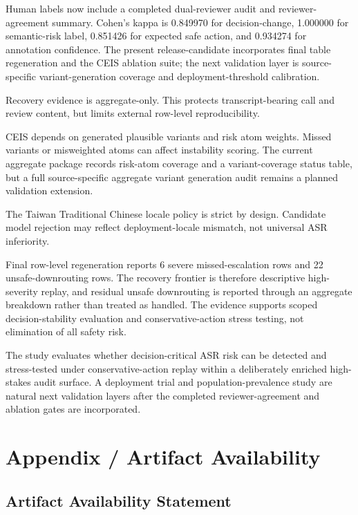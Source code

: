 \documentclass[
]{article}
\begin{document}
Human labels now include a completed dual-reviewer audit and
reviewer-agreement summary. Cohen's kappa is 0.849970 for
decision-change, 1.000000 for semantic-risk label, 0.851426 for
expected safe action, and 0.934274 for annotation confidence. The
present release-candidate incorporates final table regeneration and the
CEIS ablation suite; the next validation layer is source-specific
variant-generation coverage and deployment-threshold calibration.

Recovery evidence is aggregate-only. This protects transcript-bearing
call and review content, but limits external row-level reproducibility.

CEIS depends on generated plausible variants and risk atom weights.
Missed variants or misweighted atoms can affect instability scoring. The
current aggregate package records risk-atom coverage and a
variant-coverage status table, but a full source-specific aggregate
variant generation audit remains a planned validation extension.

The Taiwan Traditional Chinese locale policy is strict by design.
Candidate model rejection may reflect deployment-locale mismatch, not
universal ASR inferiority.

Final row-level regeneration reports 6 severe missed-escalation rows and
22 unsafe-downrouting rows. The recovery frontier is therefore
descriptive high-severity replay, and residual unsafe downrouting is
reported through an aggregate breakdown rather than treated as handled.
The evidence supports scoped decision-stability evaluation and
conservative-action stress testing, not elimination of all safety risk.

The study evaluates whether decision-critical ASR risk can be detected
and stress-tested under conservative-action replay within a deliberately
enriched high-stakes audit surface.
A deployment trial and population-prevalence study are natural next
validation layers after the completed reviewer-agreement and ablation
gates are incorporated.

\hypertarget{appendix-artifact-availability}{%
\section{Appendix / Artifact
Availability}\label{appendix-artifact-availability}}

\hypertarget{artifact-availability-statement}{%
\subsection{Artifact Availability
Statement}\label{artifact-availability-statement}}
\end{document}
